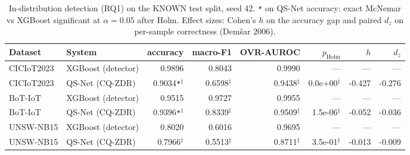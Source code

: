 \begin{table}[t]
\centering
\caption{In-distribution detection (RQ1) on the KNOWN test split, seed 42. \texttt{*} on QS-Net accuracy: exact McNemar vs XGBoost significant at $\alpha = 0.05$ after Holm. Effect sizes: Cohen's $h$ on the accuracy gap and paired $d_z$ on per-sample correctness (Dem\v{s}ar 2006).}
\label{tab:in-distribution-detection-final}
\begin{tabular}{llrrrrrr}
\toprule
Dataset & System & accuracy & macro-F1 & OVR-AUROC & $p_{\mathrm{Holm}}$ & $h$ & $d_z$ \\
\midrule
CICIoT2023 & XGBoost (detector) & 0.9896 & 0.8043 & 0.9990 & --- & --- & --- \\
CICIoT2023 & QS-Net (CQ-ZDR) & 0.9034\texttt{*}$^\ddag$ & 0.6598$^\ddag$ & 0.9438$^\ddag$ & 0.0e+00$^\ddag$ & -0.427 & -0.276 \\
BoT-IoT & XGBoost (detector) & 0.9515 & 0.9727 & 0.9955 & --- & --- & --- \\
BoT-IoT & QS-Net (CQ-ZDR) & 0.9396\texttt{*}$^\ddag$ & 0.8339$^\ddag$ & 0.9509$^\ddag$ & 1.5e-06$^\ddag$ & -0.052 & -0.036 \\
UNSW-NB15 & XGBoost (detector) & 0.8020 & 0.6016 & 0.9695 & --- & --- & --- \\
UNSW-NB15 & QS-Net (CQ-ZDR) & 0.7966$^\ddag$ & 0.5513$^\ddag$ & 0.8711$^\ddag$ & 3.5e-01$^\ddag$ & -0.013 & -0.009 \\
\bottomrule
\end{tabular}
\end{table}
